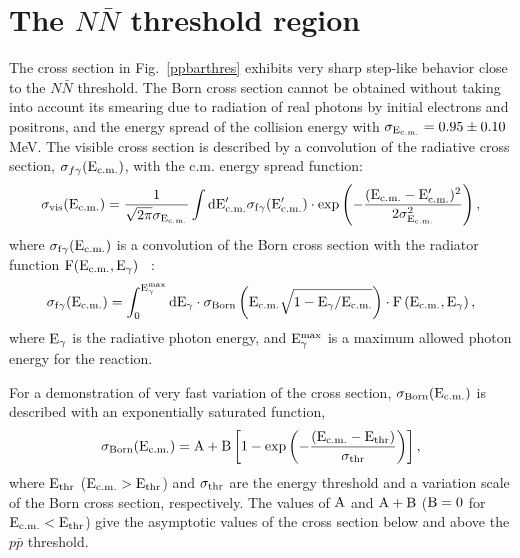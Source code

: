 \documentclass[12pt]{elsarticle}
\def\Ecm {\ensuremath{\rm E_{\rm c.m.}}}
\def\ppbar {\ensuremath{p\bar p}}
\def\NNbar {\ensuremath{N\bar N}}
\begin{document}
\section{The $\NNbar$ threshold region}
\label{xsnnbar}
The cross section in Fig.~\ref{ppbarthres} exhibits very sharp 
step-like behavior close to the $\NNbar$ threshold.  The Born cross section
cannot be obtained without taking into account  its
 smearing due to radiation of real photons by 
initial electrons and positrons, and the energy spread of the
collision energy
with $\sigma_{\Ecm} = 0.95\pm 0.10$ MeV. The visible cross section is described 
by a convolution of the radiative cross section, $\sigma_{f\gamma}(\Ecm)$, 
with the c.m. energy spread function:
\begin{eqnarray}
\label{sigborn}
\sigma_{\rm vis}(\Ecm) = \frac{1}{\sqrt{2\pi}\sigma_{\Ecm}}\int d\Ecm'
  \sigma_{\rm f\gamma}(\Ecm')\cdot
exp\left(- \frac{(\Ecm - \Ecm')^2}{2\sigma_{\Ecm}^2}\right),
\end{eqnarray}
where  $\sigma_{\rm f\gamma}(\Ecm)$ is a convolution of the Born cross section 
with the radiator function $\rm F(\Ecm, E_{\gamma})$ ~\cite{kur_fad,actis}:
%
\begin{eqnarray}
\label{sigvis}
\sigma_{\rm f\gamma}(\Ecm)=\int_0^{E_{\gamma}^{max}}
  dE_{\gamma}\cdot\sigma_{\rm Born}\left(\Ecm\sqrt{1 -
  E_{\gamma}/\Ecm}\right)\cdot
 F\left(\Ecm, E_{\gamma}\right),
\end{eqnarray}
%
where $\rm E_{\gamma}$ is the radiative photon energy, and 
 $\rm E_{\gamma}^{\rm max}$ is a maximum allowed photon energy for the reaction.

For a demonstration of very fast variation of the cross section, 
$\sigma_{\rm Born}(\Ecm)$ is described with an exponentially saturated function, 
\begin{eqnarray}
\label{fermi}
\sigma_{\rm Born}(\Ecm) = A + B\left[1 - exp\left(- \frac{(\Ecm - E_{thr})}{\sigma_{thr}}\right)\right],
\end{eqnarray}
where $\rm E_{\rm thr}$ ($\Ecm > E_{\rm thr}$) and $\rm \sigma_{\rm thr}$ are the 
energy threshold and a variation scale of the Born cross section, 
respectively. The values of $\rm A$ and $\rm A +\rm B$ ($\rm B = 0$ for $\Ecm < E_{\rm thr}$) give the asymptotic values of the cross section below 
and above the $\ppbar$ threshold.  
\end{document}
